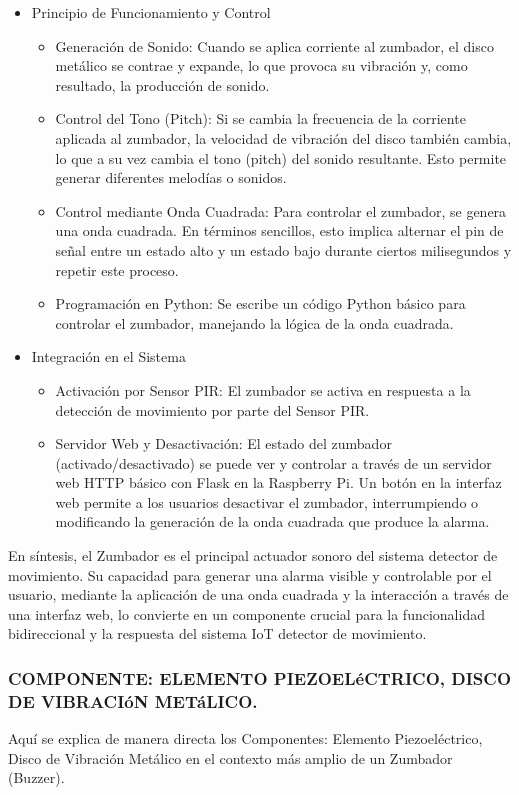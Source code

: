 \documentclass{report}
\begin{document}
\begin{itemize}
    \item Principio de Funcionamiento y Control
    \begin{itemize}
        \item Generación de Sonido: Cuando se aplica corriente al zumbador, el disco metálico se contrae y expande, lo que provoca su vibración y, 
        como resultado, la producción de sonido.
        \item Control del Tono (Pitch): Si se cambia la frecuencia de la corriente aplicada al zumbador, la velocidad de vibración del disco también 
        cambia, lo que a su vez cambia el tono (pitch) del sonido resultante. Esto permite generar diferentes melodías o sonidos.
        \item Control mediante Onda Cuadrada: Para controlar el zumbador, se genera una onda cuadrada. En términos sencillos, esto implica alternar el pin 
        de señal entre un estado alto y un estado bajo durante ciertos milisegundos y repetir este proceso.
        \item Programación en Python: Se escribe un código Python básico para controlar el zumbador, manejando la lógica de la onda cuadrada.
    \end{itemize}

    \item Integración en el Sistema
    \begin{itemize}
        \item Activación por Sensor PIR: El zumbador se activa en respuesta a la detección de movimiento por parte del Sensor PIR.
        \item Servidor Web y Desactivación: El estado del zumbador (activado/desactivado) se puede ver y controlar a través de un 
        servidor web HTTP básico con Flask en la Raspberry Pi. Un botón en la interfaz web permite a los usuarios desactivar el zumbador, 
        interrumpiendo o modificando la generación de la onda cuadrada que produce la alarma.
    \end{itemize}
\end{itemize}

En síntesis, el Zumbador es el principal actuador sonoro del sistema detector de movimiento. Su capacidad para generar una 
alarma visible y controlable por el usuario, mediante la aplicación de una onda cuadrada y la interacción a través de una interfaz 
web, lo convierte en un componente crucial para la funcionalidad bidireccional y la respuesta del sistema IoT detector de movimiento.

\subsubsection{COMPONENTE: ELEMENTO PIEZOELéCTRICO, DISCO DE VIBRACIóN METáLICO.}
Aquí se explica de manera directa los Componentes: Elemento Piezoeléctrico, Disco de Vibración Metálico en el contexto más amplio 
de un Zumbador (Buzzer).
\end{document}
